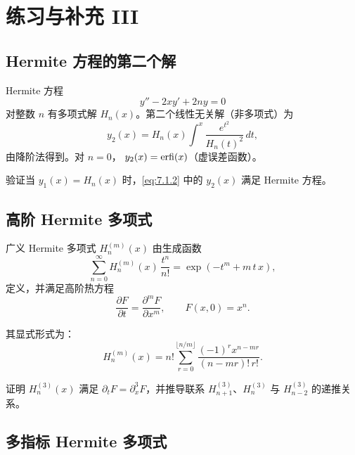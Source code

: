 \chapter{练习与补充 III}

\section{Hermite 方程的第二个解}

Hermite 方程
\begin{equation}
y'' - 2xy' + 2ny = 0
\label{eq:7.1.1}
\end{equation}
对整数 $n$ 有多项式解 $H_n(x)$。第二个线性无关解（非多项式）为
\begin{equation}
y_2(x) = H_n(x)\int^x \frac{e^{t^2}}{H_n(t)^2}\,dt,
\label{eq:7.1.2}
\end{equation}
由降阶法得到。对 $n=0$，
$y_2(x)=\operatorname{erfi}(x)$（虚误差函数）。

\begin{exercise}
验证当 $y_1(x)=H_n(x)$ 时，\eqref{eq:7.1.2} 中的 $y_2(x)$ 满足 Hermite 方程。
\end{exercise}

\section{高阶 Hermite 多项式}

广义 Hermite 多项式 $H_n^{(m)}(x)$ 由生成函数
\begin{equation}
\sum_{n=0}^{\infty} H_n^{(m)}(x)\,\frac{t^n}{n!}
= \exp\!\left(-t^m + m\,t\,x\right),
\label{eq:7.2.1}
\end{equation}
定义，并满足高阶热方程
\begin{equation}
\frac{\partial F}{\partial t} = \frac{\partial^m F}{\partial x^m},
\qquad F(x,0)=x^n.
\label{eq:7.2.2}
\end{equation}

其显式形式为：
\begin{equation}
H_n^{(m)}(x) = n!\sum_{r=0}^{\lfloor n/m\rfloor}
\frac{(-1)^r x^{n-mr}}{(n-mr)!\,r!}.
\label{eq:7.2.3}
\end{equation}

\begin{exercise}
证明 $H_n^{(3)}(x)$ 满足 $\partial_t F = \partial_x^3 F$，并推导联系 $H_{n+1}^{(3)}$、$H_n^{(3)}$ 与 $H_{n-2}^{(3)}$ 的递推关系。
\end{exercise}

\section{多指标 Hermite 多项式}

